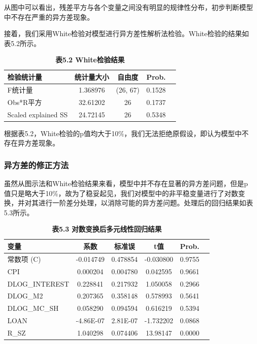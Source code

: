 \documentclass[12pt, a4paper]{article}
\numberwithin{equation}{section}
\begin{document}
从图中可以看出，残差平方与各个变量之间没有明显的规律性分布，初步判断模型中不存在严重的异方差现象。

接着，我们采用White检验对模型进行异方差性解析法检验。White检验的结果如表5.2所示。

\begin{table}[h!]
    \centering
    \captionsetup{labelformat=empty}
    \caption{\textbf{\fontsize{9pt}{11pt}\selectfont 表5.2 White检验结果}}
    \begin{tabular}{lcccc}
        \toprule
        检验统计量               & 统计量大小    & 自由度      & Prob.  \\
        \midrule
        F统计量                & 1.368976 & (26, 67) & 0.1528 \\
        Obs*R平方             & 32.61202 & 26       & 0.1737 \\
        Scaled explained SS & 24.72145 & 26       & 0.5348 \\
        \bottomrule
    \end{tabular}
\end{table}

根据表5.2，White检验的p值均大于10\%，我们无法拒绝原假设，即认为模型中不存在异方差现象。

\subsubsection{异方差的修正方法}
虽然从图示法和White检验结果来看，模型中并不存在显著的异方差问题，但是p值只是略大于10\%，故为了稳妥起见，我们对模型中的非平稳变量进行了对数变换，并对其进行一阶差分处理，以消除可能的异方差问题。处理后的回归结果如表5.3所示。

\begin{table}[h!]
    \centering
    \captionsetup{labelformat=empty}
    \caption{\textbf{\fontsize{9pt}{11pt}\selectfont 表5.3 对数变换后多元线性回归结果}}
    \begin{tabular}{lccccc}
        \toprule
        变量             & 系数        & 标准误      & t值        & Prob.  \\
        \midrule
        常数项 (C)        & -0.014749 & 0.478854 & -0.030800 & 0.9755 \\
        CPI            & 0.000204  & 0.004780 & 0.042595  & 0.9661 \\
        DLOG\_INTEREST & 0.228841  & 0.217932 & 1.050058  & 0.2966 \\
        DLOG\_M2       & 0.207365  & 0.358148 & 0.578993  & 0.5641 \\
        DLOG\_MC\_SH   & 0.058290  & 0.094594 & 0.616219  & 0.5394 \\
        LOAN           & -4.86E-07 & 2.81E-07 & -1.732202 & 0.0868 \\
        R\_SZ          & 1.040298  & 0.074406 & 13.98147  & 0.0000 \\
        \bottomrule
    \end{tabular}
\end{table}
\end{document}
